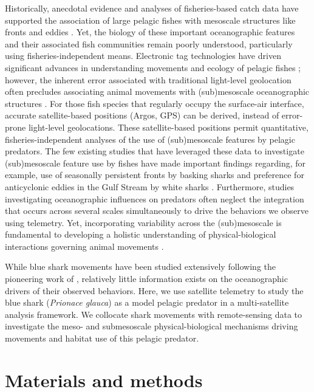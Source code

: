 Historically, anecdotal evidence and analyses of fisheries-based catch data have supported the association of large pelagic fishes with mesoscale structures like fronts and eddies \citep{Hobday2014}. Yet, the biology of these important oceanographic features and their associated fish communities remain poorly understood, particularly using fisheries-independent means. Electronic tag technologies have driven significant advances in understanding movements and ecology of pelagic fishes \citep{Skomal2009, Block2011, Thorrold2014, Berumen2014, Werry2014}; however, the inherent error associated with traditional light-level geolocation \citep[$\pm$ 100 km,][]{Braun2015, Braun2018b} often precludes associating animal movements with (sub)mesoscale oceanographic structures \citep[except see][]{BraunSwords}. For those fish species that regularly occupy the surface-air interface, accurate satellite-based positions (\eg Argos, GPS) can be derived, instead of error-prone light-level geolocations. These satellite-based positions permit quantitative, fisheries-independent analyses of the use of (sub)mesoscale features by pelagic predators. The few existing studies that have leveraged these data to investigate (sub)mesoscale feature use by fishes have made important findings regarding, for example, use of seasonally persistent fronts by basking sharks \citep{Miller2015} and preference for anticyclonic eddies in the Gulf Stream by white sharks \citep{Gaube2018}. Furthermore, studies investigating oceanographic influences on predators often neglect the integration that occurs across several scales simultaneously to drive the behaviors we observe using telemetry. Yet, incorporating variability across the (sub)mesoscale is fundamental to developing a holistic understanding of physical-biological interactions governing animal movements \citep{Fauchald2000}.

While blue shark movements have been studied extensively following the pioneering work of \citeauthor{Carey1990} \citep{Queiroz2010, Campana2016, Vandeperre2014a}, relatively little information exists on the oceanographic drivers of their observed behaviors. Here, we use satellite telemetry to study the blue shark (\textit{Prionace glauca}) as a model pelagic predator in a multi-satellite analysis framework. We collocate shark movements with remote-sensing data to investigate the meso- and submesoscale physical-biological mechanisms driving movements and habitat use of this pelagic predator. 

\section{Materials and methods}

